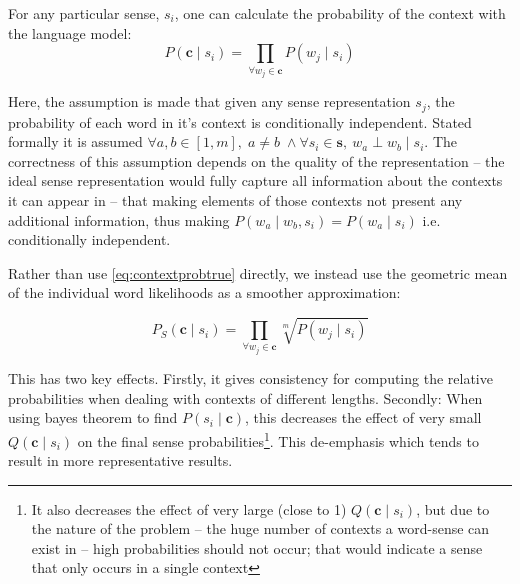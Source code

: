 \documentclass{sig-alternate}
\renewcommand{\c}{\mathbf{c}}
\begin{document}
For any particular sense, $s_i$, one can calculate the probability of the context with the language model:
\begin{equation} \label{eq:contextprobtrue} P(\c \mid s_{i})=\prod_{\forall w_{j}\in\c}P(w_{j} \mid s_{i})
\end{equation}

Here, the assumption is made that given any sense representation $s_j$, the probability of each word in it's context is conditionally independent. Stated formally it is assumed $\forall a,b \in [1,m],\; a \ne b\; \wedge \forall s_i \in \mathbf{s},\:w_a \perp w_b \mid s_i$.
The correctness of this assumption depends on the quality of the representation -- the ideal sense representation would fully capture all information about the contexts it can appear in -- that making elements of those contexts not present any additional information, thus making $P(w_a \mid w_b,s_i)=P(w_a \mid s_i)$ i.e. conditionally independent.

Rather than use \cref{eq:contextprobtrue} directly, we instead use the geometric mean of the individual word likelihoods as a smoother approximation:

\begin{equation} \label{eq:contrextprobsmooth}
P_S(\c \mid s_{i})=\prod_{\forall w_{j}\in\c}\sqrt[m]{P(w_{j} \mid s_{i})}
\end{equation}

This has two key effects. Firstly, it gives consistency for computing the relative  probabilities when dealing with contexts of different lengths. Secondly: When using bayes theorem to find $P(s_{i} \mid \c)$, this decreases the effect of very small $Q(\c \mid s_{i})$ on the final sense probabilities\footnote{It also decreases the effect of very large (close to 1) $Q(\c \mid s_{i})$, but due to the nature of the problem -- the huge number of contexts a word-sense can exist in -- high probabilities should not occur; that would indicate a sense that only occurs in a single context}. This de-emphasis which tends to result in more representative results.
\end{document}
